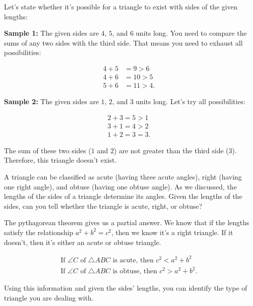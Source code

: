 \begin{example}
	\label{exm:triangle_inequality}

	Let's state whether it's possible for a triangle to exist with sides of the
	given lengths:

	\textbf{Sample 1:} The given sides are $4$, $5$, and $6$ units long. You
	need to compare the sums of any two sides with the third side. That means
	you need to exhaust all possibilities:

	\begin{align*}
		4 + 5 & = 9 > 6  \\
		4 + 6 & = 10 > 5 \\
		5 + 6 & = 11 > 4
		.\end{align*}

	\textbf{Sample 2:} The given sides are $1$, $2$, and $3$ units long. Let's
	try all possibilities:

	\begin{align*}
		2 + 3 = 5 > 1 \\
		3 + 1 = 4 > 2 \\
		1 + 2 = 3 = 3
		.\end{align*}

	The sum of these two sides ($1$ and $2$) are not greater than the third side
	($3$). Therefore, this triangle doesn't exist.
\end{example}

A triangle can be classified as acute (having three acute angles), right
(having one right angle), and obtuse (having one obtuse angle). As we
discussed, the lengths of the sides of a triangle determine its angles. Given
the lengths of the sides, can you tell whether the triangle is acute, right, or
obtuse?

The pythagorean theorem gives us a partial answer. We know that if the lengths
satisfy the relationship $a^{2} + b^{2} = c^{2}$, then we know it's a right
triangle. If it doesn't, then it's either an acute or obtuse triangle.

\begin{align*}
	\textrm{If } \angle C \textrm{ of } \triangle ABC \textrm{ is acute, then } c^{2} < a^{2} + b^{2} \\
	\textrm{If } \angle C \textrm{ of } \triangle ABC \textrm{ is obtuse, then } c^{2} > a^{2} + b^{2}
	.\end{align*}

Using this information and given the sides' lengths, you can identify the type
of triangle you are dealing with.

